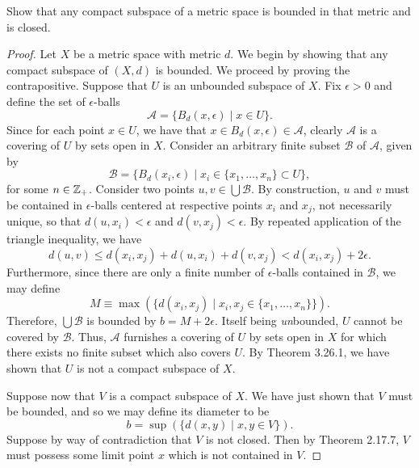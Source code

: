 \begin{exercise}[ID=3.26.4]
  Show that any compact subspace of a metric space is bounded in that metric and is closed.
\end{exercise}
%
\begin{solution}
  \begin{proof}
    Let $X$ be a metric space with metric $d$.
    We begin by showing that any compact subspace of $(X, d)$ is bounded.
    We proceed by proving the contrapositive.
    Suppose that $U$ is an unbounded subspace of $X$.
    Fix $\epsilon > 0$ and define the set of $\epsilon$-balls
    \begin{equation*}
      \mathcal{A} = \{B_d(x, \epsilon) \mid x \in U\}.
    \end{equation*}
    Since for each point $x \in U$, we have that $x \in B_d(x, \epsilon) \in \mathcal{A}$, clearly $\mathcal{A}$ is a covering of $U$ by sets open in $X$.
    Consider an arbitrary finite subset $\mathcal{B}$ of $\mathcal{A}$, given by
    \begin{equation*}
      \mathcal{B} = \{B_d(x_i, \epsilon) \mid x_i \in \{x_1, \ldots, x_n\} \subset U\},
    \end{equation*}
    for some $n \in \mathbb{Z}_+$.
    Consider two points $u, v \in \bigcup \mathcal{B}$.
    By construction, $u$ and $v$ must be contained in $\epsilon$-balls centered at respective points $x_i$ and $x_j$, not necessarily unique, so that $d(u, x_i) < \epsilon$ and $d(v, x_j) < \epsilon$.
    By repeated application of the triangle inequality, we have
    \begin{equation*}
      d(u, v) \leq d(x_i, x_j) + d(u, x_i) + d(v, x_j) < d(x_i, x_j) + 2 \epsilon.
    \end{equation*}
    Furthermore, since there are only a finite number of $\epsilon$-balls contained in $\mathcal{B}$, we may define
    \begin{equation*}
      M \equiv \max(\{d(x_i, x_j) \mid x_i, x_j \in \{x_1, \ldots, x_n\}\}).
    \end{equation*}
    Therefore, $\bigcup \mathcal{B}$ is bounded by $b = M + 2 \epsilon$.
    Itself being \textit{un}bounded, $U$ cannot be covered by $\mathcal{B}$.
    Thus, $\mathcal{A}$ furnishes a covering of $U$ by sets open in $X$ for which there exists no finite subset which also covers $U$.
    By Theorem 3.26.1, we have shown that $U$ is not a compact subspace of $X$.

    Suppose now that $V$ is a compact subspace of $X$.
    We have just shown that $V$ must be bounded, and so we may define its diameter to be
    \begin{equation*}
      b = \sup{\left(\{d(x, y) \mid x, y \in V\}\right)}.
    \end{equation*}
    Suppose by way of contradiction that $V$ is not closed.
    Then by Theorem 2.17.7, $V$ must possess some limit point $x$ which is not contained in $V$.


\end{proof}
\end{solution}
